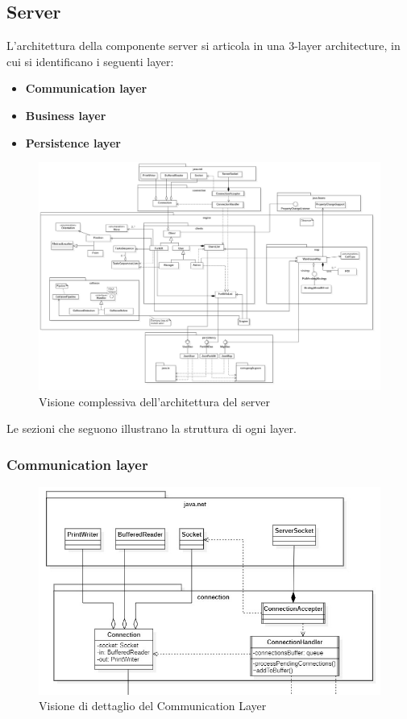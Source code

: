 \subsection{Server}

L'architettura della componente server si articola in una 3-layer architecture, in cui si identificano i seguenti layer:
\begin{itemize}
	\item \textbf{Communication layer}
	\item \textbf{Business layer}
	\item \textbf{Persistence layer}
\end{itemize}

\begin{figure}[H]
	\centering
	\includegraphics[scale=0.22]{res/diagrams/server/server_complessivo_minimal.jpg}
	\caption{Visione complessiva dell'architettura del server}
\end{figure}

Le sezioni che seguono illustrano la struttura di ogni layer.

\subsubsection{Communication layer}

\begin{figure}[H]
	\centering
	\includegraphics[scale=0.55]{res/diagrams/server/server_communication.jpg}
	\caption{Visione di dettaglio del Communication Layer}
\end{figure}


